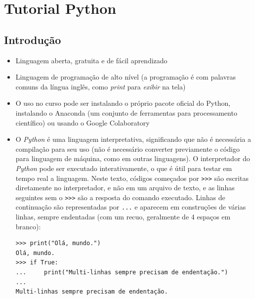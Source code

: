 \chapter{Tutorial Python}
\section{Introdução}
\begin{itemize}
	\item Linguagem aberta, gratuita e de fácil aprendizado
	\item Linguagem de programação de alto nível (a programação é com palavras comuns da língua inglês, como \textit{print} para \textit{exibir} na tela)
	\item O uso no curso pode ser instalando o próprio pacote oficial do Python, instalando o Anaconda (um conjunto de ferramentas para processamento científico) ou usando o Google Colaboratory
	\item O \textit{Python} é uma linguagem interpretativa, significando que não é necessária a compilação para seu uso (não é necessário converter previamente o código para linguagem de máquina, como em outras linguagens). O interpretador do \textit{Python} pode ser executado interativamente, o que é útil para testar em tempo real a linguagem. Neste texto, códigos começados por \verb|>>>| são escritas diretamente no interpretador, e não em um arquivo de texto, e as linhas seguintes sem o \verb|>>>| são a resposta do comando executado. Linhas de continuação são representadas por \verb|...| e aparecem em construções de várias linhas, sempre endentadas (com um recuo, geralmente de 4 espaços em branco):
	\begin{verbatim}
>>> print("Olá, mundo.")
Olá, mundo.
>>> if True:
...     print("Multi-linhas sempre precisam de endentação.")
... 
Multi-linhas sempre precisam de endentação.
	\end{verbatim}
\end{itemize}

